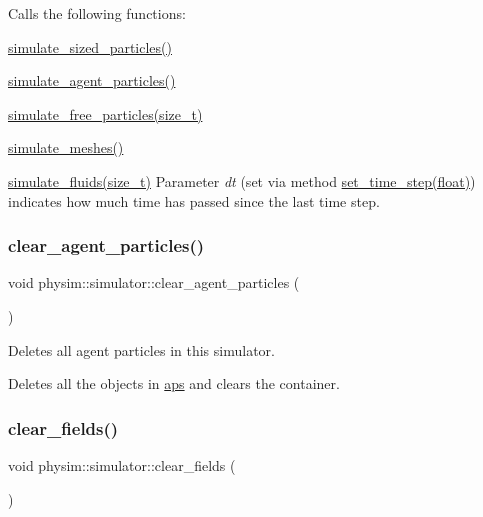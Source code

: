 Calls the following functions\+:
\begin{DoxyItemize}
\item \hyperlink{classphysim_1_1simulator_ac99a02f99b4f83501478093d402abea5}{simulate\+\_\+sized\+\_\+particles()}
\item \hyperlink{classphysim_1_1simulator_a99dbf5870ec5383266f87e60c1686049}{simulate\+\_\+agent\+\_\+particles()}
\item \hyperlink{classphysim_1_1simulator_af4c6a7a02feeb89263fa557a1ea3de7e}{simulate\+\_\+free\+\_\+particles(size\+\_\+t)}
\item \hyperlink{classphysim_1_1simulator_aea4165314f9285dfc3b64ba9a2666aaf}{simulate\+\_\+meshes()}
\item \hyperlink{classphysim_1_1simulator_acb3359c9faedfc69191bf9a4618eebfa}{simulate\+\_\+fluids(size\+\_\+t)} Parameter {\itshape dt} (set via method \hyperlink{classphysim_1_1simulator_ab86bf6d22fd222a299183c9d82a71bc1}{set\+\_\+time\+\_\+step(float)}) indicates how much time has passed since the last time step. 
\end{DoxyItemize}\mbox{\label{classphysim_1_1simulator_a903bf3d4f155e8e524d4031b24042142}} 
\subsubsection{\texorpdfstring{clear\+\_\+agent\+\_\+particles()}{clear\_agent\_particles()}}
{\footnotesize\ttfamily void physim\+::simulator\+::clear\+\_\+agent\+\_\+particles (\begin{DoxyParamCaption}{ }\end{DoxyParamCaption})}



Deletes all agent particles in this simulator. 

Deletes all the objects in \hyperlink{classphysim_1_1simulator_a838f036ef9d378d1e3f5207c3f031b52}{aps} and clears the container. \mbox{\label{classphysim_1_1simulator_afe53c23ae11f78166576ad44f56ee953}} 
\subsubsection{\texorpdfstring{clear\+\_\+fields()}{clear\_fields()}}
{\footnotesize\ttfamily void physim\+::simulator\+::clear\+\_\+fields (\begin{DoxyParamCaption}{ }\end{DoxyParamCaption})}



